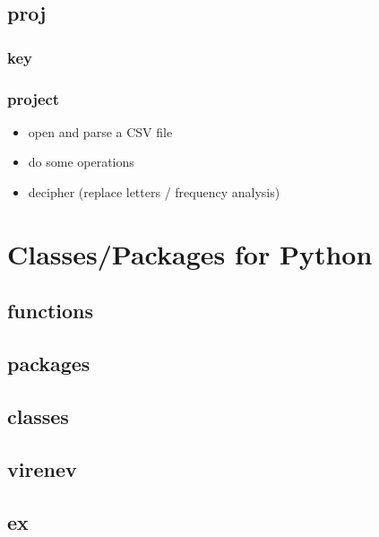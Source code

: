 \documentclass[
]{book}
\providecommand{\tightlist}{%
  \setlength{\itemsep}{0pt}\setlength{\parskip}{0pt}}
\begin{document}
\hypertarget{proj}{%
\section{proj}\label{proj}}

\hypertarget{key}{%
\subsection{key}\label{key}}

\hypertarget{project}{%
\subsection{project}\label{project}}

\begin{itemize}
\tightlist
\item
  open and parse a CSV file
\item
  do some operations
\item
  decipher (replace letters / frequency analysis)
\end{itemize}

\hypertarget{classespackages-for-python}{%
\chapter{Classes/Packages for Python}\label{classespackages-for-python}}

\hypertarget{functions}{%
\section{functions}\label{functions}}

\hypertarget{packages}{%
\section{packages}\label{packages}}

\hypertarget{classes}{%
\section{classes}\label{classes}}

\hypertarget{virenev}{%
\section{virenev}\label{virenev}}

\hypertarget{ex}{%
\section{ex}\label{ex}}
\end{document}
